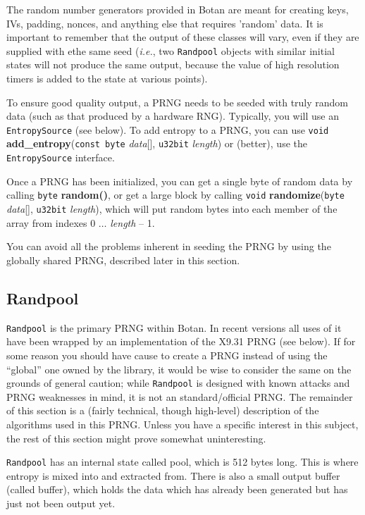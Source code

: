 \documentclass{article}
\newcommand{\function}[1]{\textbf{#1}}
\newcommand{\type}[1]{\texttt{#1}}
\renewcommand{\arg}[1]{\textsl{#1}}
\newcommand{\ie}[0]{\emph{i.e.}}
\begin{document}
The random number generators provided in Botan are meant for creating
keys, IVs, padding, nonces, and anything else that requires 'random'
data. It is important to remember that the output of these classes
will vary, even if they are supplied with ethe same seed (\ie, two
\type{Randpool} objects with similar initial states will not produce
the same output, because the value of high resolution timers is added
to the state at various points).

To ensure good quality output, a PRNG needs to be seeded with truly random data
(such as that produced by a hardware RNG). Typically, you will use an
\type{EntropySource} (see below). To add entropy to a PRNG, you can use
\type{void} \function{add\_entropy}(\type{const byte} \arg{data}[],
\type{u32bit} \arg{length}) or (better), use the \type{EntropySource}
interface.

Once a PRNG has been initialized, you can get a single byte of random data by
calling \type{byte} \function{random()}, or get a large block by calling
\type{void} \function{randomize}(\type{byte} \arg{data}[], \type{u32bit}
\arg{length}), which will put random bytes into each member of the array from
indexes 0 $\ldots$ \arg{length} -- 1.

You can avoid all the problems inherent in seeding the PRNG by using the
globally shared PRNG, described later in this section.

\subsection{Randpool}

\type{Randpool} is the primary PRNG within Botan. In recent versions all uses
of it have been wrapped by an implementation of the X9.31 PRNG (see below). If
for some reason you should have cause to create a PRNG instead of using the
``global'' one owned by the library, it would be wise to consider the same on
the grounds of general caution; while \type{Randpool} is designed with known
attacks and PRNG weaknesses in mind, it is not an standard/official PRNG. The
remainder of this section is a (fairly technical, though high-level) description
of the algorithms used in this PRNG. Unless you have a specific interest in
this subject, the rest of this section might prove somewhat uninteresting.

\type{Randpool} has an internal state called pool, which is 512 bytes
long. This is where entropy is mixed into and extracted from. There is also a
small output buffer (called buffer), which holds the data which has already
been generated but has just not been output yet.
\end{document}
